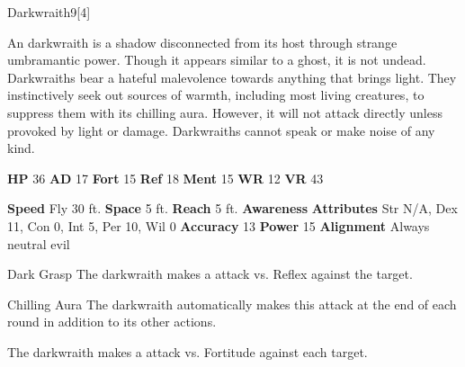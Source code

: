   \begin{monsection}{Darkwraith}{9}[4]
    \vspace{-1em}\vspace{-1em}
    \vspace{0em}

    
      An darkwraith is a shadow disconnected from its host through strange umbramantic power.
      Though it appears similar to a ghost, it is not undead.
      Darkwraiths bear a hateful malevolence towards anything that brings light.
      They instinctively seek out sources of warmth, including most living creatures, to suppress them with its chilling aura.
      However, it will not attack directly unless provoked by light or damage.
      Darkwraiths cannot speak or make noise of any kind.
    
    

    \begin{spellcontent}
      \begin{spelltargetinginfo}
        \pari \textbf{HP} 36 \monsep
          \textbf{AD} 17 \monsep
          \textbf{Fort} 15 \monsep
          \textbf{Ref} 18 \monsep
          \textbf{Ment} 15
        \pari \textbf{WR} 12 \monsep
        \textbf{VR} 43
        
      \end{spelltargetinginfo}
    \end{spellcontent}
    \begin{monsterfooter}
      \pari \textbf{Speed} Fly 30 ft. \monsep
        \textbf{Space} 5 ft. \monsep
        \textbf{Reach} 5 ft.
      \pari \textbf{Awareness} 
      \pari \textbf{Attributes}
        Str N/A, Dex 11,
        Con 0, Int 5,
        Per 10, Wil 0
      \pari \textbf{Accuracy} 13 \monsep
        \textbf{Power} 15
      \pari \textbf{Alignment} Always neutral evil
    \end{monsterfooter}
  \end{monsection}
  \begin{freeability}{Dark Grasp}
       The darkwraith makes a  attack
        vs. Reflex against the target.
    \end{freeability}
  

    \begin{freeability}{Chilling Aura}
      The darkwraith automatically makes this attack at the end of each round in addition to its other actions.
          \par The darkwraith makes a  attack
        vs. Fortitude against each target.
    \end{freeability}
  
